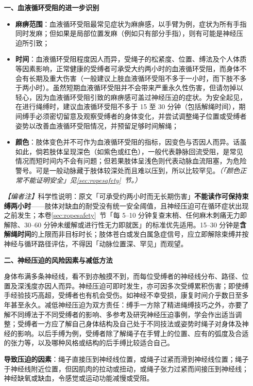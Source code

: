 \documentclass[12pt,UTF8]{ctexbook}
\begin{document}
\noindent\textbf{一、血液循环受阻的进一步识别}
\begin{itemize}
\item \textbf{麻痹范围}：血液循环受阻最常见症状为麻痹感，以手臂为例，症状为所有手指同时发麻；但如果是局部位置发麻（例如只有部分手指），则有可能是神经压迫所引致；
\item \textbf{时间}：血液循环受阻程度因人而异，受绳子的松紧度、位置、缚法及个人体质等因素影响，正常健康的受缚者可承受大约两小时的血液循环受阻，而身体不会有长期及重大伤害（一般建议上肢血液循环受阻不多于一小时，而下肢不多于两小时）。虽然短期血液循环受阻并不会带来严重永久性伤害，但请勿掉以轻心，因为血液循环受阻引致的麻痹感可盖过神经压迫的症状。为安全起见，在进行绳缚时，建议血液循环受阻不多于 15 至 30 分钟（包括解绳时间），期间缚手必须密切留意及观察受缚者的身体变化，并尝试调整绳子位置或受缚者姿势以改善血液循环受阻情况，并预留足够时间解绳；
\item \textbf{颜色}：肢体变色并不可作为血液循环受阻的指标，因变色与否因人而异。话虽如此，倘若肢体呈现深色（如紫色或红色），一般代表静脉回流受阻，是常见情况而短时间内不会有问题；但若果肢体呈浅色则代表动脉血流阻塞，为危险警号。可是一般动脉藏于肢体较深处而且难以压到，所以比较罕见。\textit{（「颜色正常不能证明安全」见\ref{sec:ropesafety}~节。）}
\end{itemize}

\noindent\textit{【编者注】}科学性说明：原文「可承受约两小时而无长期伤害」\textbf{不能读作可保持束缚两小时}——肢体对缺血的耐受没有统一安全阈值，且神经压迫可在循环症状出现之前发生；本卷\ref{sec:ropesafety}~节「每 5--10 分钟复查末梢、任何麻木刺痛无力即解除、30--60 分钟未缓解或进行性无力即就医」的标准优先适用。15--30 分钟是\textbf{含解绳时间}的上限而非目标时长；肢体苍白或发白属急症信号，应立即解除束缚并按神经与循环路径评估，不得因「动脉位置深、罕见」而观望。

\noindent\textbf{二、神经压迫的风险因素与减低方法}

身体布满多条神经线，看不到亦触摸不到，而每位受缚者的神经线分布、路径、位置及深浅度亦因人而异。神经压迫可即时发生，亦可因多次受缚累积伤害；即使缚手经验技巧高超，受缚者也有机会受伤。如神经不幸受损，康复时间介乎数日至多年甚至永久。减低神经压迫为双方责任：缚手一方除了精进绳缚技巧之外，亦要了解不同缚法于不同受缚者的影响、多参考及研究神经压迫事例，学会作出适当调整；受缚者一方应了解自己身体结构及自己处于不同技法或姿势时绳子对身体及神经的影响。以后手缚为例，受缚者除了解绳子在手臂上的位置、应有的弧度及合适的张力等，以及哪种风格或结构的后手缚比较适合自己。

\textbf{导致压迫的因素}：绳子直接压到神经线位置，或绳子过紧而滑到神经线位置；绳子于神经线附近位置，但因肌肉的拉动或扭动，或绳子张力过紧而间接压到神经线；神经缺氧或缺血，令感觉或运动功能减慢或受阻。
\end{document}
